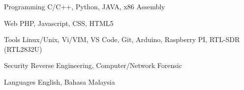 

\begin{cvskills}

  \cvskill
    {Programming} %
    {C/C++, Python, JAVA, x86 Assembly} %

  \cvskill
    {Web} %
    {PHP, Javascript, CSS, HTML5} %

  \cvskill
    {Tools} %
    {Linux/Unix, Vi/VIM, VS Code, Git, Arduino, Raspberry PI, RTL-SDR (RTL2832U)} %

  \cvskill
    {Security} %
    {Reverse Engineering, Computer/Network Forensic} %

  \cvskill
    {Languages} %
    {English, Bahasa Malaysia} %

\end{cvskills}
